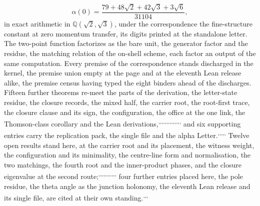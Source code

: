 \begin{equation}
\alpha(0) = \frac{79 + 48\sqrt{2} + 42\sqrt{3} + 3\sqrt{6}}{31104},
\label{eq:alpha}
\end{equation}
in exact arithmetic in $\mathbb{Q}(\sqrt{2},\sqrt{3})$, under the correspondence the fine-structure constant at zero momentum transfer, its digits printed at the standalone letter.
The two-point function factorizes as the bare unit, the generator factor and the residue, the matching relation of the on-shell scheme, each factor an output of the same computation. Every premise of the correspondence stands discharged in the kernel, the premise union empty at the page and at the eleventh Lean release alike, the premise census having typed the eight binders ahead of the discharges.
Fifteen further theorems re-meet the parts of the derivation, the letter-state residue, the closure records, the mixed half, the carrier root, the root-first trace, the closure clause and its sign, the configuration, the office at the one link, the Thomson-class corollary and the Lean derivations,\textsuperscript{,}\textsuperscript{,}\textsuperscript{,}\textsuperscript{,}\textsuperscript{,}\textsuperscript{,}\textsuperscript{,}\textsuperscript{,}\textsuperscript{,}\textsuperscript{,}\textsuperscript{,}\textsuperscript{,}\textsuperscript{,}\textsuperscript{,} and six supporting entries carry the replication pack, the single file and the alpha Letter.\textsuperscript{,}\textsuperscript{,}\textsuperscript{,}\textsuperscript{,}\textsuperscript{,}
Twelve open results stand here, at the carrier root and its placement, the witness weight, the configuration and its minimality, the centre-line form and normalisation, the two matchings, the fourth root and the inner-product phases, and the closure eigenvalue at the second route;\textsuperscript{,}\textsuperscript{,}\textsuperscript{,}\textsuperscript{,}\textsuperscript{,}\textsuperscript{,}\textsuperscript{,}\textsuperscript{,}\textsuperscript{,}\textsuperscript{,}\textsuperscript{,} four further entries placed here, the pole residue, the theta angle as the junction holonomy, the eleventh Lean release and its single file, are cited at their own standing.\textsuperscript{,}\textsuperscript{,}\textsuperscript{,}
